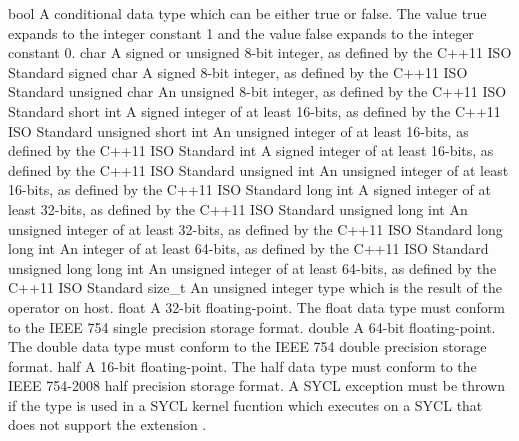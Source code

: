 \addRow
{
  bool
}
{
  A conditional data type which can be either true or false. The value
  true expands to the integer constant 1 and the value false expands to the
  integer constant 0.
}
\addRow
{
  char
}
{
  A signed or unsigned 8-bit integer, as defined by the C++11 ISO Standard
}
\addRow
{
  signed char
}
{
  A signed 8-bit integer, as defined by the C++11 ISO Standard
}
\addRow
{
  unsigned char
}
{
  An unsigned 8-bit integer, as defined by the C++11 ISO Standard
}
\addRow
{
  short int
}
{
  A signed integer of at least 16-bits, as defined by the C++11 ISO Standard
}
\addRow
{
  unsigned short int
}
{
  An unsigned integer of at least 16-bits, as defined by the C++11 ISO Standard
}
\addRow
{
  int
}
{
  A signed integer of at least 16-bits, as defined by the C++11 ISO Standard
}
\addRow
{
  unsigned int
}
{
  An unsigned integer of at least 16-bits, as defined by the C++11 ISO Standard
}
\addRow
{
  long int
}
{
  A signed integer of at least 32-bits, as defined by the C++11 ISO Standard
}
\addRow
{
  unsigned long int
}
{
  An unsigned integer of at least 32-bits, as defined by the C++11 ISO Standard
}
\addRow
{
  long long int
}
{
  An integer of at least 64-bits, as defined by the C++11 ISO Standard
}
\addRow
{
  unsigned long long int
}
{
  An unsigned integer of at least 64-bits, as defined by the C++11 ISO Standard
}
\addRow
{
  size_t
}
{
  An unsigned integer type which is the result of the 
  operator on host.
}
\addRow
{
  float
}
{
  A 32-bit floating-point. The float data type must conform to the IEEE 754
  single precision storage format.
}
\addRow
{
 double
}
{
  A 64-bit floating-point. The double data type must conform to the IEEE 754
  double precision storage format.
}
\addRow
{
  half
}
{
  A 16-bit floating-point. The half data type must conform to the IEEE 754-2008
  half precision storage format. A SYCL 
  exception must be thrown if the  type is used in a SYCL
  kernel fucntion which executes on a SYCL  that does not
  support the extension .
}
\completeTable

